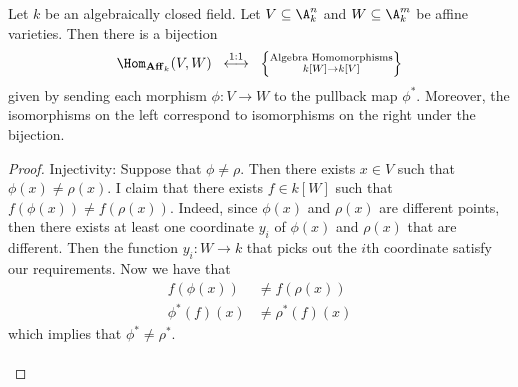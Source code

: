 \documentclass[a4paper]{article}
\begin{document}
\begin{prp}{}{} Let $k$ be an algebraically closed field. Let $V\subseteq\A_k^n$ and $W\subseteq\A_k^m$ be affine varieties. Then there is a bijection $$\Hom_{\bold{Aff}_k}(V,W)\;\;\overset{\text{1:1}}{\longleftrightarrow}\;\;\left\{\substack{\text{Algebra Homomorphisms}\\ k[W]\to k[V]}\right\}$$ given by sending each morphism $\phi:V\to W$ to the pullback map $\phi^\ast$. Moreover, the isomorphisms on the left correspond to isomorphisms on the right under the bijection. 
\begin{proof}
Injectivity: Suppose that $\phi\neq\rho$. Then there exists $x\in V$ such that $\phi(x)\neq\rho(x)$. I claim that there exists $f\in k[W]$ such that $f(\phi(x))\neq f(\rho(x))$. Indeed, since $\phi(x)$ and $\rho(x)$ are different points, then there exists at least one coordinate $y_i$ of $\phi(x)$ and $\rho(x)$ that are different. Then the function $y_i:W\to k$ that picks out the $i$th coordinate satisfy our requirements. Now we have that 
\begin{align*}
f(\phi(x))&\neq f(\rho(x))\\
\phi^\ast(f)(x)&\neq\rho^\ast(f)(x)
\end{align*}
which implies that $\phi^\ast\neq\rho^\ast$. \\~\\


\end{proof}
\end{prp}
\end{document}
